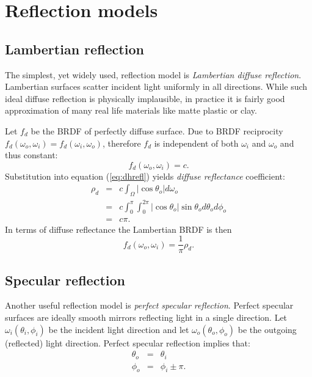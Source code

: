 \section{Reflection models}

\subsection{Lambertian reflection}
The simplest, yet widely used, reflection model is \emph{Lambertian diffuse reflection}. Lambertian surfaces scatter incident light uniformly in all directions. While such ideal diffuse reflection is physically implausible, in practice it is fairly good approximation of many real life materials like matte plastic or clay.

Let $f_{d}$ be the BRDF of perfectly diffuse surface. Due to BRDF reciprocity $f_{d}(\omega_{o}, \omega_{i}) = f_{d}(\omega_{i}, \omega_{o})$, therefore $f_{d}$ is independent of both $\omega_{i}$ and $\omega_{o}$ and thus constant:
\begin{equation}
  f_{d}(\omega_{o}, \omega_{i}) = c.
\end{equation}
Substitution into equation (\ref{eq:dhrefl}) yields \emph{diffuse reflectance} coefficient:
\begin{eqnarray}
  \rho_{d} &=& c \int_{\Omega} |\cos\theta_{o}| d\omega_{o} \\
  &=& c \int_{0}^{\pi} \int_{0}^{2\pi} |\cos\theta_{o}| \sin\theta_{o} d\theta_{o} d\phi_{o} \\
  &=& c \pi.
\end{eqnarray}
In terms of diffuse reflectance the Lambertian BRDF is then
\begin{equation}
  f_{d}(\omega_{o}, \omega_{i}) = \frac{1}{\pi} \rho_{d}.
\end{equation}

\subsection{Specular reflection}
Another useful reflection model is \emph{perfect specular reflection}. Perfect specular surfaces are ideally smooth mirrors reflecting light in a single direction. Let $\omega_{i}(\theta_{i}, \phi_{i})$ be the incident light direction and let $\omega_{o}(\theta_{o}, \phi_{o})$ be the outgoing (reflected) light direction. Perfect specular reflection implies that:
\begin{eqnarray}
\label{eq:reflection}
  \theta_{o} &=& \theta_{i} \nonumber \\
  \phi_{o} &=& \phi_{i} \pm \pi.
\end{eqnarray}

